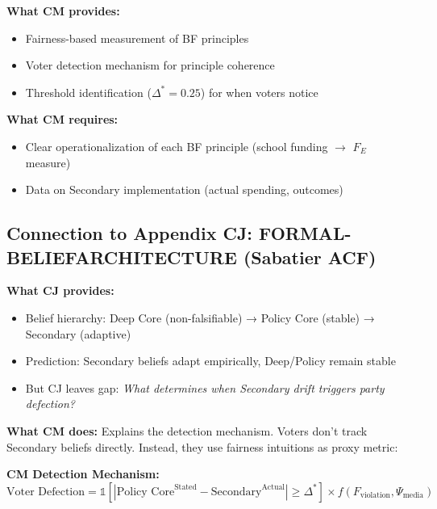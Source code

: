 \begin{tcolorbox}[colback=yellow!5!white, colframe=yellow!75!black,
    title=Integration: Appendix CM $\leftrightarrow$ Appendix BF]

\textbf{What CM provides:}
\begin{itemize}[nosep]
\item Fairness-based measurement of BF principles
\item Voter detection mechanism for principle coherence
\item Threshold identification ($\Delta^* = 0.25$) for when voters notice
\end{itemize}

\textbf{What CM requires:}
\begin{itemize}[nosep]
\item Clear operationalization of each BF principle (school funding $\rightarrow$ $F_E$ measure)
\item Data on Secondary implementation (actual spending, outcomes)
\end{itemize}

\end{tcolorbox}

\subsection{Connection to Appendix CJ: FORMAL-BELIEFARCHITECTURE (Sabatier ACF)}

\textbf{What CJ provides:}
\begin{itemize}[nosep]
\item Belief hierarchy: Deep Core (non-falsifiable) → Policy Core (stable) → Secondary (adaptive)
\item Prediction: Secondary beliefs adapt empirically, Deep/Policy remain stable
\item But CJ leaves gap: \textit{What determines when Secondary drift triggers party defection?}
\end{itemize}

\textbf{What CM does:}
Explains the detection mechanism. Voters don't track Secondary beliefs directly. Instead,
they use fairness intuitions as proxy metric:

\textbf{CM Detection Mechanism:}
\begin{equation}
\text{Voter Defection} = \mathbb{1}[|\text{Policy Core}^{\text{Stated}} - \text{Secondary}^{\text{Actual}}| \geq \Delta^*] \times f(F_{\text{violation}}, \Psi_{\text{media}})
\end{equation}

